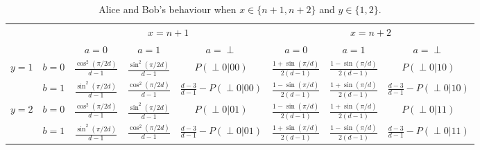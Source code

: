 \documentclass[11pt,letterpaper]{article}
\newcommand{\1}{\mathbb{1}}
\newcommand{\pr}[2]{P(#1|#2)}
\theoremstyle{definition}
\begin{document}
\begin{table}[H]
\begin{center}
\begin{tabular}{|c|c||c|c|c|c|c|c|}
\hline
\multicolumn{2}{|c|}{} &
\multicolumn{3}{|c|}{$x=n+1$}&
\multicolumn{3}{|c|}{$x=n+2$} \\
\cline{3-8}
\multicolumn{2}{|c|}{} &
$a = 0$ & $a=1$ & $a=\perp$ &
$a = 0$ & $a=1$ & $a=\perp$\\
\hline
\hline
\multirow{2}{*}{$y = 1$} & $b=0$ & $\frac{\cos^2(\pi/2d)}{d-1}$ & $\frac{\sin^2(\pi/2d)}{d-1}$ & \small $\pr{\perp0}{00}$ 
& $\frac{1+\sin(\pi/d)}{2(d-1)}$ & $\frac{1-\sin(\pi/d)}{2(d-1)}$ & \small  $\pr{\perp0}{10}$ \\
\cline{2-8}
&$b=1$ & $\frac{\sin^2(\pi/2d)}{d-1}$ & $\frac{\cos^2(\pi/2d)}{d-1}$ & $\frac{d-3}{d-1}-\pr{\perp0}{00}$ 
&  $\frac{1-\sin(\pi/d)}{2(d-1)}$ & $\frac{1+\sin(\pi/d)}{2(d-1)}$ & \small $\frac{d-3}{d-1} - \pr{\perp0}{10}$  \\
\hline
\multirow{2}{*}{$y = 2$} & $b=0$ & $\frac{\cos^2(\pi/2d)}{d-1}$ & $\frac{\sin^2(\pi/2d)}{d-1}$ & \small $\pr{\perp0}{01}$ & 
$ \frac{1-\sin(\pi/d)}{2(d-1)}$ & $ \frac{1+\sin(\pi/d)}{2(d-1)}$ & \small $\pr{\perp 0}{11}$  \\
\cline{2-8}
&$b=1$ & $\frac{\sin^2(\pi/2d)}{d-1}$ & $\frac{\cos^2(\pi/2d)}{d-1}$ & \small $\frac{d-3}{d-1}-\pr{\perp0}{01}$ &  
$ \frac{1+\sin(\pi/d)}{2(d-1)}$ & $ \frac{1-\sin(\pi/d)}{2(d-1)}$ & \small $\frac{d-3}{d-1}- \pr{\perp 0}{11}$ \\
\hline
\end{tabular}
\end{center}
\caption{Alice and Bob's behaviour when $x \in \{n+1, n+2\}$ and $y \in \{1,2\}$.}
\label{tb:chsh}
\end{table}
\end{document}

